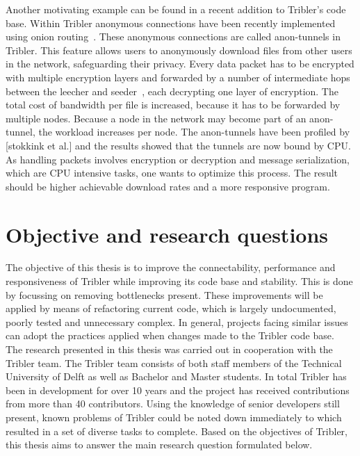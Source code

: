 Another motivating example can be found in a recent addition to Tribler's code base.
Within Tribler anonymous connections have been recently implemented using onion routing~\cite{Plak-anonymous,ruigrok-anonymous,tanaskoski-anonymous}.
These anonymous connections are called anon-tunnels in Tribler.
This feature allows users to anonymously download files from other users in the network, safeguarding their privacy.
Every data packet has to be encrypted with multiple encryption layers and forwarded by a number of intermediate hops between the leecher and seeder~\cite{Plak-anonymous,tanaskoski-anonymous}, each decrypting one layer of encryption.
The total cost of bandwidth per file is increased, because it has to be forwarded by multiple nodes.
Because a node in the network may become part of an anon-tunnel, the workload increases per node.
The anon-tunnels have been profiled by [stokkink et al.]  and the results showed that the tunnels are now bound by CPU.
As handling packets involves encryption or decryption and message serialization, which are CPU intensive tasks, one wants to optimize this process.
The result should be higher achievable download rates and a more responsive program.


\section{Objective and research questions}
\label{chp1:sct:objectives-research-questions}
The objective of this thesis is to improve the connectability, performance and responsiveness of Tribler while improving its code base and stability. 
This is done by focussing on removing bottlenecks present.
These improvements will be applied by means of refactoring current code, which is largely undocumented, poorly tested and unnecessary complex.
In general, projects facing similar issues can adopt the practices applied when changes made to the Tribler code base.\\

The research presented in this thesis was carried out in cooperation with the Tribler team. 
The Tribler team consists of both staff members of the Technical University of Delft as well as Bachelor and Master students.
In total Tribler has been in development for over 10 years and the project has received contributions from more than 40 contributors.
Using the knowledge of senior developers still present, known problems of Tribler could be noted down immediately to which resulted in a set of diverse tasks to complete.
Based on the objectives of Tribler, this thesis aims to answer the main research question formulated below.\\

